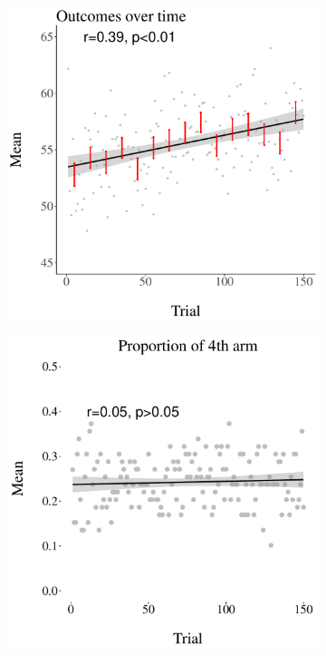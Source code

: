 \documentclass[a4paper,natbib]{apa6}
\begin{document}
\begin{figure}[htbp]
\centering
\begin{subfigure}{.32\textwidth}
\centering
\includegraphics[width=.95\textwidth]{meanovertime2.pdf}
\caption{}
\end{subfigure}
\begin{subfigure}{.32\textwidth}
 \centering
  \includegraphics[width=.95\textwidth]{figure27.pdf}

\end{subfigure}
\end{figure}
\end{document}
